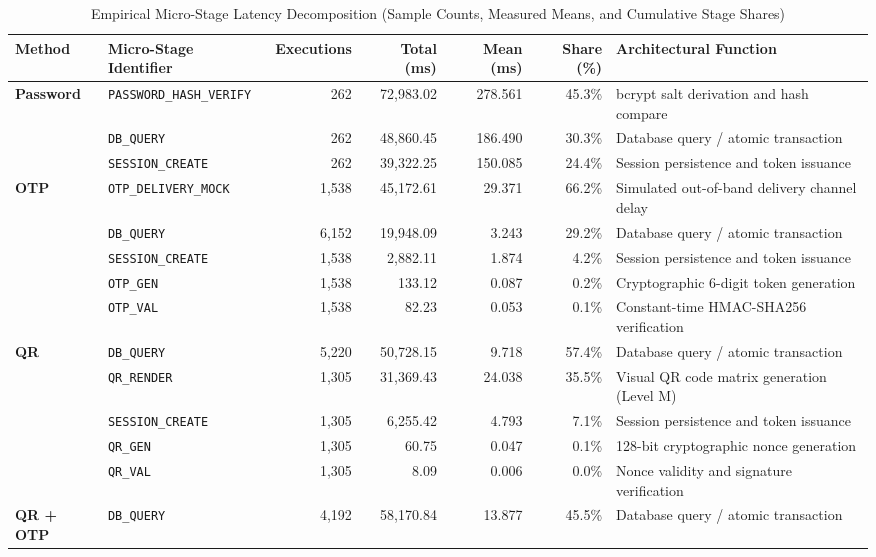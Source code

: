 \begin{table}[t]
\centering
\small
\caption{Empirical Micro-Stage Latency Decomposition (Sample Counts, Measured Means, and Cumulative Stage Shares)}
\label{tab:stage_decomposition}
\begin{tabular}{llrrrrl}
\hline
\textbf{Method} & \textbf{Micro-Stage Identifier} & \textbf{Executions} & \textbf{Total (ms)} & \textbf{Mean (ms)} & \textbf{Share (\%)} & \textbf{Architectural Function} \\
\hline
\textbf{Password} & \texttt{PASSWORD_HASH_VERIFY} & 262 & 72,983.02 & 278.561 & 45.3\% & bcrypt salt derivation and hash compare \\
 & \texttt{DB_QUERY} & 262 & 48,860.45 & 186.490 & 30.3\% & Database query / atomic transaction \\
 & \texttt{SESSION_CREATE} & 262 & 39,322.25 & 150.085 & 24.4\% & Session persistence and token issuance \\
\hline
\textbf{OTP} & \texttt{OTP_DELIVERY_MOCK} & 1,538 & 45,172.61 & 29.371 & 66.2\% & Simulated out-of-band delivery channel delay \\
 & \texttt{DB_QUERY} & 6,152 & 19,948.09 & 3.243 & 29.2\% & Database query / atomic transaction \\
 & \texttt{SESSION_CREATE} & 1,538 & 2,882.11 & 1.874 & 4.2\% & Session persistence and token issuance \\
 & \texttt{OTP_GEN} & 1,538 & 133.12 & 0.087 & 0.2\% & Cryptographic 6-digit token generation \\
 & \texttt{OTP_VAL} & 1,538 & 82.23 & 0.053 & 0.1\% & Constant-time HMAC-SHA256 verification \\
\hline
\textbf{QR} & \texttt{DB_QUERY} & 5,220 & 50,728.15 & 9.718 & 57.4\% & Database query / atomic transaction \\
 & \texttt{QR_RENDER} & 1,305 & 31,369.43 & 24.038 & 35.5\% & Visual QR code matrix generation (Level M) \\
 & \texttt{SESSION_CREATE} & 1,305 & 6,255.42 & 4.793 & 7.1\% & Session persistence and token issuance \\
 & \texttt{QR_GEN} & 1,305 & 60.75 & 0.047 & 0.1\% & 128-bit cryptographic nonce generation \\
 & \texttt{QR_VAL} & 1,305 & 8.09 & 0.006 & 0.0\% & Nonce validity and signature verification \\
\hline
\textbf{QR + OTP} & \texttt{DB_QUERY} & 4,192 & 58,170.84 & 13.877 & 45.5\% & Database query / atomic transaction \\

\end{tabular}
\end{table}
